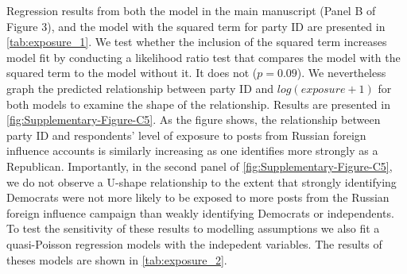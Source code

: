 \documentclass[
  12pt,
]{article}
\begin{document}
Regression results from both the model in the main manuscript (Panel B of Figure 3), and the model with the squared term for party ID are presented in \autoref{tab:exposure_1}. We test whether the inclusion of the squared term increases model fit by conducting a likelihood ratio test that compares the model with the squared term to the model without it. It does not (\(p = 0.09\)). We nevertheless graph the predicted relationship between party ID and \(log(exposure + 1)\) for both models to examine the shape of the relationship. Results are presented in \autoref{fig:Supplementary-Figure-C5}. As the figure shows, the relationship between party ID and respondents' level of exposure to posts from Russian foreign influence accounts is similarly increasing as one identifies more strongly as a Republican. Importantly, in the second panel of \autoref{fig:Supplementary-Figure-C5}, we do not observe a U-shape relationship to the extent that strongly identifying Democrats were not more likely to be exposed to more posts from the Russian foreign influence campaign than weakly identifying Democrats or independents. To test the sensitivity of these results to modelling assumptions we also fit a quasi-Poisson regression models with the indepedent variables. The results of theses models are shown in \autoref{tab:exposure_2}.
\end{document}
